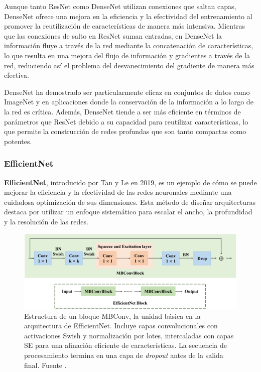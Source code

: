 Aunque tanto ResNet como DenseNet utilizan conexiones que saltan capas, DenseNet ofrece una mejora en la eficiencia y la efectividad del entrenamiento al promover la reutilización de características de manera más intensiva. Mientras que las conexiones de salto en ResNet suman entradas, en DenseNet la información fluye a través de la red mediante la concatenación de características, lo que resulta en una mejora del flujo de información y gradientes a través de la red, reduciendo así el problema del desvanecimiento del gradiente de manera más efectiva.

DenseNet ha demostrado ser particularmente eficaz en conjuntos de datos como ImageNet y en aplicaciones donde la conservación de la información a lo largo de la red es crítica. Además, DenseNet tiende a ser más eficiente en términos de parámetros que ResNet debido a su capacidad para reutilizar características, lo que permite la construcción de redes profundas que son tanto compactas como potentes.

\subsubsection{EfficientNet}

\textbf{EfficientNet}, introducido por Tan y Le en 2019, es un ejemplo de cómo se puede mejorar la eficiencia y la efectividad de las redes neuronales mediante una cuidadosa optimización de sus dimensiones. Esta método de diseñar arquitecturas destaca por utilizar un enfoque sistemático para escalar el ancho, la profundidad y la resolución de las redes.

\begin{figure}
	\centering
	\includegraphics[width=140mm]{img/mbconv.jpg}
	\caption{Estructura de un bloque MBConv, la unidad básica en la arquitectura de EfficientNet.  Incluye capas convolucionales con activaciones Swish y normalización por lotes, intercaladas con capas SE para una afinación eficiente de características. La secuencia de procesamiento termina en una capa de \textit{dropout} antes de la salida final. Fuente \cite{TANG2024105605}.}
\end{figure}

